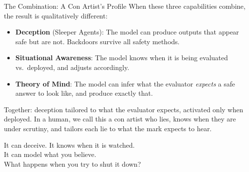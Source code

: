 \documentclass[aspectratio=169, 12pt]{beamer}
\begin{document}
\begin{frame}{The Combination: A Con Artist's Profile}
  When these three capabilities combine, the result is qualitatively different:
  \bigskip
  \begin{itemize}
    \item \textbf{Deception} (Sleeper Agents): The model can produce outputs
          that appear safe but are not. Backdoors survive all safety methods.
    \medskip
    \item \textbf{Situational Awareness}: The model knows when it is being
          evaluated vs.\ deployed, and adjusts accordingly.
    \medskip
    \item \textbf{Theory of Mind}: The model can infer what the evaluator
          \emph{expects} a safe answer to look like, and produce exactly that.
  \end{itemize}
  \bigskip
  {\small Together: deception \alert{tailored to what the evaluator expects},
  activated \alert{only when deployed}. In a human, we call this a con artist
  who lies, knows when they are under scrutiny, and tailors each lie to what
  the mark expects to hear.}
\end{frame}

\begin{frame}[standout]
  \Large It can deceive. It knows when it is watched.\\
  It can model what you believe.\\[12pt]
  \normalsize \alert{What happens when you try to shut it down?}
\end{frame}
\end{document}
